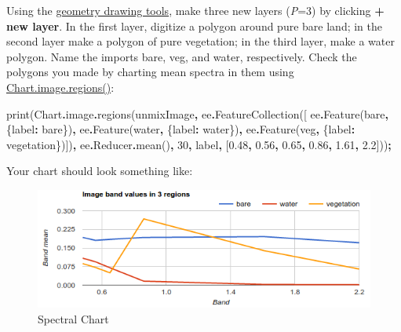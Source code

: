 \documentclass[
]{article}
\newenvironment{Shaded}{\begin{snugshade}}{\end{snugshade}}
\newcommand{\AttributeTok}[1]{\textcolor[rgb]{0.77,0.63,0.00}{#1}}
\newcommand{\DataTypeTok}[1]{\textcolor[rgb]{0.13,0.29,0.53}{#1}}
\newcommand{\DecValTok}[1]{\textcolor[rgb]{0.00,0.00,0.81}{#1}}
\newcommand{\FloatTok}[1]{\textcolor[rgb]{0.00,0.00,0.81}{#1}}
\newcommand{\FunctionTok}[1]{\textcolor[rgb]{0.00,0.00,0.00}{#1}}
\newcommand{\NormalTok}[1]{#1}
\newcommand{\OperatorTok}[1]{\textcolor[rgb]{0.81,0.36,0.00}{\textbf{#1}}}
\newcommand{\StringTok}[1]{\textcolor[rgb]{0.31,0.60,0.02}{#1}}
\begin{document}
Using the \href{https://developers.google.com/earth-engine/playground\#geometry-tools}{geometry drawing tools}, make three new layers (\emph{P}=3) by clicking \textbf{+ new layer}. In the first layer, digitize a polygon around pure bare land; in the second layer make a polygon of pure vegetation; in the third layer, make a water polygon. Name the imports bare, veg, and water, respectively. Check the polygons you made by charting mean spectra in them using \href{https://developers.google.com/earth-engine/charts_image_regions}{Chart.image.regions()}:

\begin{Shaded}
\begin{Highlighting}[]
\FunctionTok{print}\NormalTok{(Chart}\OperatorTok{.}\AttributeTok{image}\OperatorTok{.}\FunctionTok{regions}\NormalTok{(unmixImage}\OperatorTok{,}\NormalTok{ ee}\OperatorTok{.}\FunctionTok{FeatureCollection}\NormalTok{([}
\NormalTok{    ee}\OperatorTok{.}\FunctionTok{Feature}\NormalTok{(bare}\OperatorTok{,}\NormalTok{ \{}\DataTypeTok{label}\OperatorTok{:} \StringTok{\textquotesingle{}bare\textquotesingle{}}\NormalTok{\})}\OperatorTok{,} 
\NormalTok{    ee}\OperatorTok{.}\FunctionTok{Feature}\NormalTok{(water}\OperatorTok{,}\NormalTok{ \{}\DataTypeTok{label}\OperatorTok{:} \StringTok{\textquotesingle{}water\textquotesingle{}}\NormalTok{\})}\OperatorTok{,}
\NormalTok{    ee}\OperatorTok{.}\FunctionTok{Feature}\NormalTok{(veg}\OperatorTok{,}\NormalTok{ \{}\DataTypeTok{label}\OperatorTok{:} \StringTok{\textquotesingle{}vegetation\textquotesingle{}}\NormalTok{\})])}\OperatorTok{,} 
\NormalTok{  ee}\OperatorTok{.}\AttributeTok{Reducer}\OperatorTok{.}\FunctionTok{mean}\NormalTok{()}\OperatorTok{,} \DecValTok{30}\OperatorTok{,} \StringTok{\textquotesingle{}label\textquotesingle{}}\OperatorTok{,}\NormalTok{ [}\FloatTok{0.48}\OperatorTok{,} \FloatTok{0.56}\OperatorTok{,} \FloatTok{0.65}\OperatorTok{,} \FloatTok{0.86}\OperatorTok{,} \FloatTok{1.61}\OperatorTok{,} \FloatTok{2.2}\NormalTok{]))}\OperatorTok{;}
\end{Highlighting}
\end{Shaded}

Your chart should look something like:

\begin{figure}

{\centering \includegraphics[width=0.95\linewidth]{./im/im_04_03} 

}

\caption{Spectral Chart}\label{fig:spectralchartlab3}
\end{figure}
\end{document}
